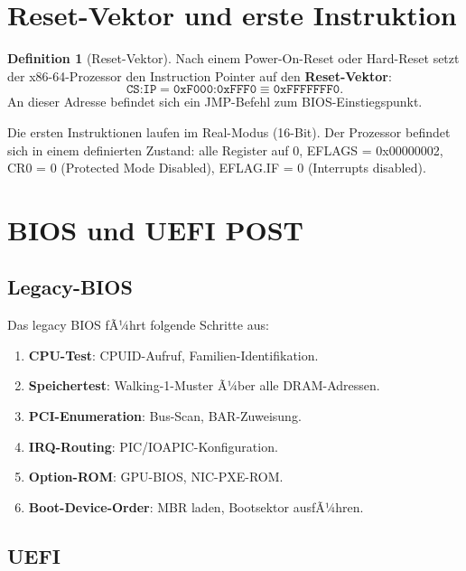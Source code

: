 ﻿\documentclass[a4paper,12pt]{scrreprt}
\theoremstyle{definition}
\newtheorem{definition}{Definition}[chapter]
\begin{document}
	\section{Reset-Vektor und erste Instruktion}
	
	\begin{definition}[Reset-Vektor]
		Nach einem Power-On-Reset oder Hard-Reset setzt der x86-64-Prozessor den
		Instruction Pointer auf den \textbf{Reset-Vektor}:
		\[
		\texttt{CS:IP} = \texttt{0xF000:0xFFF0} \equiv \texttt{0xFFFFFFF0}.
		\]
		An dieser Adresse befindet sich ein JMP-Befehl zum BIOS-Einstiegspunkt.
	\end{definition}
	
	Die ersten Instruktionen laufen im Real-Modus (16-Bit). Der Prozessor befindet
	sich in einem definierten Zustand: alle Register auf 0, EFLAGS = 0x00000002,
	CR0 = 0 (Protected Mode Disabled), EFLAG.IF = 0 (Interrupts disabled).
	
	\section{BIOS und UEFI POST}
	
	\subsection{Legacy-BIOS}
	
	Das legacy BIOS fÃ¼hrt folgende Schritte aus:
	\begin{enumerate}
		\item \textbf{CPU-Test}: CPUID-Aufruf, Familien-Identifikation.
		\item \textbf{Speichertest}: Walking-1-Muster Ã¼ber alle DRAM-Adressen.
		\item \textbf{PCI-Enumeration}: Bus-Scan, BAR-Zuweisung.
		\item \textbf{IRQ-Routing}: PIC/IOAPIC-Konfiguration.
		\item \textbf{Option-ROM}: GPU-BIOS, NIC-PXE-ROM.
		\item \textbf{Boot-Device-Order}: MBR laden, Bootsektor ausfÃ¼hren.
	\end{enumerate}
	
	\subsection{UEFI}
\end{document}
